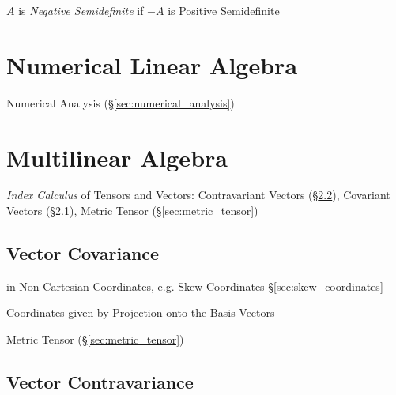 $A$ is \emph{Negative Semidefinite} if $-A$ is Positive Semidefinite



\section{Numerical Linear Algebra}\label{sec:numerical_linear_algebra}

\fist Numerical Analysis (\S\ref{sec:numerical_analysis})



\section{Multilinear Algebra}\label{sec:multilinear_algebra}

\emph{Index Calculus} of Tensors and Vectors: Contravariant Vectors
(\S\ref{sec:vector_contravariance}), Covariant Vectors
(\S\ref{sec:vector_covariance}), Metric Tensor (\S\ref{sec:metric_tensor})



\subsection{Vector Covariance}\label{sec:vector_covariance}

in Non-Cartesian Coordinates, e.g. Skew Coordinates \S\ref{sec:skew_coordinates}

Coordinates given by Projection onto the Basis Vectors

Metric Tensor (\S\ref{sec:metric_tensor})



\subsection{Vector Contravariance}\label{sec:vector_contravariance}

